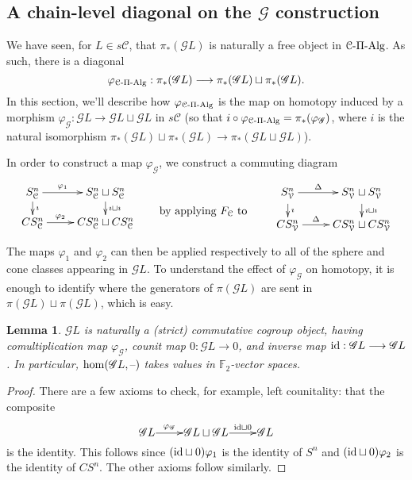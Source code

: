 \documentclass[11pt]{amsart}
\theoremstyle{plain}
\newtheorem{lem}[thm]{Lemma}
\theoremstyle{definition}
\newcommand{\DASH}{\textup{--}}
\let\phi\varphi
\renewcommand{\to}{\longrightarrow}
\newcommand{\scrG}{\mathscr{G}}
\newcommand{\calC}{\mathcal{C}}
\newcommand{\calV}{\mathcal{V}}
\theoremstyle{plain}
\newcommand{\vect}[2]{\calV^{#1}_{#2}}
\newcommand{\BSW}{{\scrG}}
\newcommand{\PiAlg}{\textup{-$\Pi$-Alg}}
\newcommand{\F}{\mathbb{F}}
\newcommand{\Id}{\textup{id}}
\begin{document}
\begin{Composite functor spectral sequences}
\subsection{A chain-level diagonal on the $\BSW $ construction}
\label{Subsection: Chain level diagonal}
We have seen, for $L\in s\calC$, that $\pi_*(\BSW L)$ is naturally a free object in $\calC\PiAlg$. As such, there is a diagonal
\[\phi_{\calC\PiAlg}:\pi_*(\BSW L)\to \pi_*(\BSW L)\sqcup \pi_*(\BSW L).\]
In this section, we'll describe how $\phi_{\calC\PiAlg}$ is the map on homotopy induced by a morphism $\phi_\BSW :\BSW L\to \BSW L\sqcup \BSW L$ in $s\calC$ (so that $i\circ\phi_{\calC\PiAlg}=\pi_*(\phi_{\BSW})$, where $i$ is the natural isomorphism $\pi_*(\BSW L)\sqcup\pi_*(\BSW L)\to \pi_*(\BSW L\sqcup \BSW L)$).

In order to construct a map $\phi_\BSW $, we construct a commuting diagram
\[\xymatrix@R=4mm{
S^n_{\calC}\ar[r]^-{\phi_1}
\ar[d]^-{\imath}
&%
S^n_{\calC}\sqcup S^n_{\calC}\ar[d]^-{\imath\sqcup\imath}
\\%
CS^n_{\calC}\ar[r]^-{\phi_2}
&%
CS^n_{\calC}\sqcup CS^n_{\calC}%
}\qquad \textup{\raisebox{-6mm}{by applying $F_\calC$ to }}\qquad \xymatrix@R=4mm{
S^n_{\vect{}{}}\ar[r]^-{\Delta}
\ar[d]^-{\imath}
&%
S^n_{\vect{}{}}\sqcup S^n_{\vect{}{}}\ar[d]^-{\imath\sqcup\imath}
\\%
CS^n_{\vect{}{}}\ar[r]^-{\Delta}
&%
CS^n_{\vect{}{}}\sqcup CS^n_{\vect{}{}}%
}\]
The maps $\phi_1$ and $\phi_2$ can then be applied respectively to all of the sphere and cone classes appearing in $\BSW L$.
To understand the effect of $\phi_{\BSW }$ on homotopy, it is enough to identify where the generators of $\pi(\BSW L)$ are sent in $\pi(\BSW L)\sqcup\pi(\BSW L)$, which is easy.
\begin{lem}
$\BSW L$ is naturally a (strict) commutative cogroup object, having comultiplication map $\phi_{\BSW }$, counit map $0:\BSW L\to 0$, and inverse map $\Id:\BSW L\to \BSW L$. In particular, $\hom(\BSW L,\DASH)$ takes values in $\ensuremath{\F_2}$-vector spaces.
\end{lem}
\begin{proof}
There are a few axioms to check, for example, left counitality: that the composite 
\[\xymatrix@R=4mm@1{
\BSW L\ar[r]^-{\phi_{\BSW }}
&%
\BSW L\sqcup \BSW L\ar[r]^-{\Id\sqcup0}
&%
\BSW L%
}\] is the identity. This follows since $(\Id\sqcup0)\phi_1$ is the identity of $S^n$ and $(\Id\sqcup0)\phi_2$ is the identity of $CS^n$. The other axioms follow similarly.
\end{proof}


\end{Composite functor spectral sequences}
\end{document}
